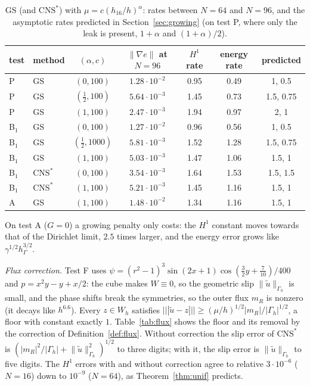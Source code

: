 \documentclass[pdflatex,sn-mathphys-num]{sn-jnl}
\theoremstyle{thmstyleone}
\theoremstyle{thmstylethree}
\newcommand{\hG}{h_\Gamma}
\newcommand{\Gh}{\Gamma_h}
\newcommand{\Wh}{W_h}
\newcommand{\ut}{\tilde u}
\newcommand{\tnorm}[1]{|\!|\!|#1|\!|\!|}
\newcommand{\norm}[1]{\lVert #1\rVert}
\newcommand{\GS}{\mathrm{GS}}
\newcommand{\CNS}{\mathrm{CNS}^\ast}
\begin{document}
\begin{table}[t]
\centering\small
\caption{$\GS$ (and $\CNS$) with $\mu=c(h_{16}/h)^\alpha$: rates between $N=64$ and $N=96$, and the asymptotic rates predicted in Section~\ref{sec:growing} (on test P, where only the leak is present, $1+\alpha$ and $(1+\alpha)/2$).}\label{tab:rescue}
\begin{tabular}{llccccc}
\toprule
test & method & $(\alpha,c)$ & $\norm{\nabla e}$ at $N=96$ & $H^1$ rate & energy rate & predicted\\
\midrule
P & $\GS$ & $(0,100)$ & $1.28\cdot10^{-2}$ & 0.95 & 0.49 & 1, 0.5\\
P & $\GS$ & $(\frac12,100)$ & $5.64\cdot10^{-3}$ & 1.45 & 0.73 & 1.5, 0.75\\
P & $\GS$ & $(1,100)$ & $2.47\cdot10^{-3}$ & 1.94 & 0.97 & 2, 1\\
B$_1$ & $\GS$ & $(0,100)$ & $1.27\cdot10^{-2}$ & 0.96 & 0.56 & 1, 0.5\\
B$_1$ & $\GS$ & $(\frac12,1000)$ & $5.81\cdot10^{-3}$ & 1.52 & 1.28 & 1.5, 0.75\\
B$_1$ & $\GS$ & $(1,100)$ & $5.03\cdot10^{-3}$ & 1.47 & 1.06 & 1.5, 1\\
B$_1$ & $\CNS$ & $(0,100)$ & $3.54\cdot10^{-3}$ & 1.64 & 1.53 & 1.5, 1.5\\
B$_1$ & $\CNS$ & $(1,100)$ & $5.21\cdot10^{-3}$ & 1.45 & 1.16 & 1.5, 1\\
A & $\GS$ & $(1,100)$ & $1.48\cdot10^{-2}$ & 1.34 & 1.16 & 1.5, 1\\
\bottomrule
\end{tabular}
\end{table} On test A ($G=0$) a growing penalty only costs: the $H^1$ constant moves towards that of the Dirichlet limit, $2.5$ times larger, and the energy error grows like $\gamma^{1/2}\hG^{3/2}$.

\emph{Flux correction.} Test F uses $\psi=(r^2-1)^3\sin(2x+1)\cos(\frac32y+\frac7{10})/400$ and $p=x^2y-y+x/2$: the cube makes $W\equiv0$, so the geometric slip $\norm{\ut}_{\Gh}$ is small, and the phase shifts break the symmetries, so the outer flux $m_R$ is nonzero (it decays like $h^{6.6}$). Every $z\in\Wh$ satisfies $\tnorm{\ut-z}\ge(\mu/h)^{1/2}|m_R|/|\Gh|^{1/2}$, a floor with constant exactly $1$. Table~\ref{tab:flux} shows the floor and its removal by the correction of Definition~\ref{def:flux}. Without correction the slip error of $\CNS$ is $(|m_R|^2/|\Gh|+\norm{\ut}^2_{\Gh})^{1/2}$ to three digits; with it, the slip error is $\norm{\ut}_{\Gh}$ to five digits. The $H^1$ errors with and without correction agree to relative $3\cdot10^{-6}$ ($N=16$) down to $10^{-9}$ ($N=64$), as Theorem~\ref{thm:unif} predicts.
\end{document}
